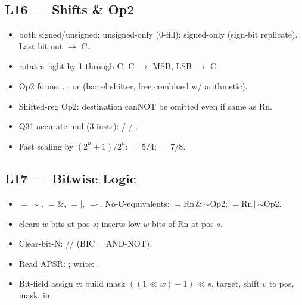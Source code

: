 \subsection{L16 --- Shifts \& Op2}
\begin{itemize}
\item {} both signed/unsigned;  unsigned-only (0-fill);  signed-only (sign-bit replicate). Last bit out $\to$ C.
\item {} rotates right by 1 through C: C $\to$ MSB, LSB $\to$ C.
\item Op2 forms: , , or  (barrel shifter, free combined w/ arithmetic).
\item Shifted-reg Op2: destination canNOT be omitted even if same as Rn.
\item Q31 accurate mul (3 instr):  /  / .
\item Fast scaling by $(2^n\pm1)/2^n$: $=5/4$; $=7/8$.
\end{itemize}

\subsection{L17 --- Bitwise Logic}
\begin{itemize}
\item {}$=\sim$, $=\&$, $=|$, $=\hat{}\,$. No-C-equivalents: $=$Rn\,\&\,$\sim$Op2; $=$Rn\,$|$\,$\sim$Op2.
\item {} clears $w$ bits at pos $s$;  inserts low-$w$ bits of Rn at pos $s$.
\item Clear-bit-N: // (BIC$=$AND-NOT).
\item Read APSR: ; write: .
\item Bit-field assign $v$: build mask $((1\!\ll\!w)-1)\!\ll\!s$,  target, shift $v$ to pos,  mask,  in.
\end{itemize}

